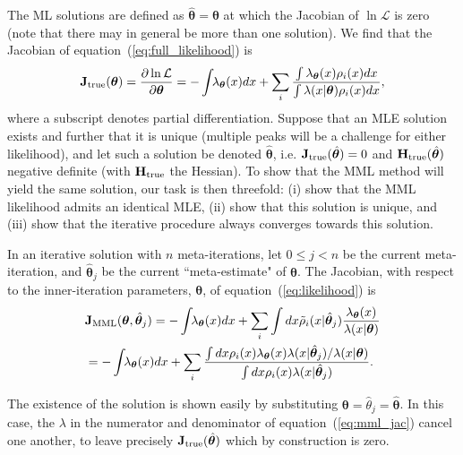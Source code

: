 \documentclass[a4paper,fleqn,usenatbib]{mnras}
\newcommand{\be}{\begin{equation}}
\newcommand{\ee}{\end{equation}}
\renewcommand{\L}{\mathcal{L}}
\newcommand{\eq}[1]{equation~(\ref{eq:#1})}
\newcommand{\para}{{\bm{\theta}}}
\begin{document}
The ML solutions are defined as $\hat{\para} = \para$ at which the Jacobian of $\ln \L$ is zero (note that there may in general be more than one solution). We find that the Jacobian of \eq{full_likelihood} is
\begin{equation}
	\label{eq:full_jac}
	\mathbf{J}_{\rm true}(\para) = \frac{\partial \ln \L}{\partial \para} = -\int\!\!\lambda_\para (x)dx + \sum_i \frac{\int \lambda_\para(x) \rho_i(x) dx}{\int \lambda(x|\para) \rho_i(x) dx},
\end{equation}
where a subscript denotes partial differentiation. 
Suppose that an MLE solution exists and further that it is unique (multiple peaks will be a challenge for either likelihood), and let such a solution be denoted $\hat{\para}$, i.e. $\mathbf{J}_{\rm true}(\hat{\para}) = 0$ and $\mathbf{H}_{\rm true}(\hat{\para})$ negative definite (with $\mathbf{H}_{\rm true}$ the Hessian). 
To show that the MML method will yield the same solution, our task is then threefold: (i) show that the MML likelihood admits an identical MLE, (ii) show that this solution is unique, and (iii) show that the iterative procedure always converges towards this solution.

In an iterative solution with $n$ meta-iterations, let $0\leq j <n$ be the current meta-iteration, and $\hat{\para}_j$ be the current ``meta-estimate" of $\para$. The Jacobian, with respect to the inner-iteration parameters, $\para$,  of \eq{likelihood} is
\be\begin{split}
\label{eq:mml_jac}
	& \mathbf{J}_{\rm MML}(\para, \hat{\para}_j) = -\int\!\!\lambda_\para (x)dx + \sum_i \int dx \tilde{\rho}_i(x|\hat{\para}_j) \frac{\lambda_\para(x)}{\lambda(x|\para)} \\
    &= -\int\!\!\lambda_\para (x)dx + \sum_i  \frac{\int dx \rho_i(x)\lambda_\para(x) \lambda(x|\hat{\para}_j)/\lambda(x|\para)}{\int dx \rho_i(x) \lambda(x|\hat{\para}_j)}.
\end{split}
\ee

The existence of the solution is shown easily by substituting $\para = \hat{\theta}_j = \hat{\para}$. In this case, the $\lambda$ in the numerator and denominator of \eq{mml_jac} cancel one another, to leave precisely $\mathbf{J}_{\rm true}(\hat{\para})$ which by construction is zero.
\end{document}
